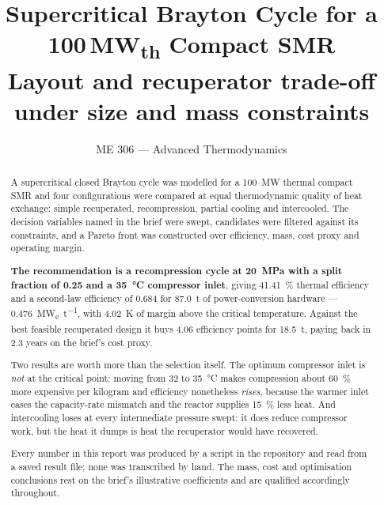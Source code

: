

\title{\vspace{-1.5cm}\textbf{Supercritical  Brayton Cycle for a
100\,MW\textsubscript{th} Compact SMR}\\[2mm]
\large Layout and recuperator trade-off under size and mass constraints}
\author{ME 306 --- Advanced Thermodynamics}
\date{}


\maketitle
\vspace{-1cm}

\begin{abstract}
\noindent
A supercritical  closed Brayton cycle was modelled for a
\SI{100}{\mega\watt} thermal compact SMR and four configurations were
compared at equal thermodynamic quality of heat exchange: simple
recuperated, recompression, partial cooling and intercooled. The
decision variables named in the brief were swept, candidates were
filtered against its constraints, and a Pareto front was constructed
over efficiency, mass, cost proxy and operating margin.

\textbf{The recommendation is a recompression cycle at
\SI{20}{\mega\pascal} with a split fraction of \num{0.25} and a
\SI{35}{\celsius} compressor inlet}, giving \SI{41.41}{\percent}
thermal efficiency and a second-law efficiency of \num{0.684} for
\SI{87.0}{\tonne} of power-conversion hardware ---
\SI{0.476}{\mega\watt_e\per\tonne}, with \SI{4.02}{\kelvin} of margin
above the critical temperature. Against the best feasible recuperated
design it buys \num{4.06} efficiency points for \SI{18.5}{\tonne},
paying back in \num{2.3} years on the brief's cost proxy.

Two results are worth more than the selection itself. The optimum
compressor inlet is \emph{not} at the critical point: moving from
\num{32} to \SI{35}{\celsius} makes compression about
\SI{60}{\percent} more expensive per kilogram and efficiency
nonetheless \emph{rises}, because the warmer inlet eases the
capacity-rate mismatch and the reactor supplies \SI{15}{\percent} less
heat. And intercooling loses at every intermediate pressure swept: it
does reduce compressor work, but the heat it dumps is heat the
recuperator would have recovered.

Every number in this report was produced by a script in the
repository and read from a saved result file; none was transcribed by
hand. The mass, cost and optimisation conclusions rest on the brief's
illustrative coefficients and are qualified accordingly throughout.
\end{abstract}

\tableofcontents
\newpage

\newcommand{\tbl}[1]{../documentation/latex/tables/#1}
\newcommand{\dat}[1]{../documentation/latex/data/#1}
\newcommand{\dgm}[1]{../documentation/latex/diagrams/#1}





